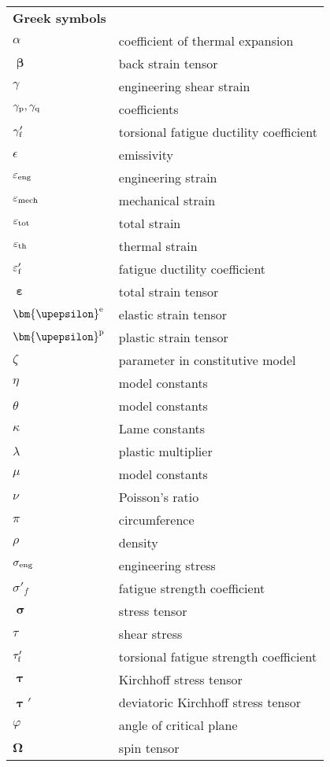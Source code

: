 \renewcommand\arraystretch{1.0}

\begin{table}[htb]
  \centering
    \begin{tabular}{p{3cm}p{10.5cm}}
    \textbf{Greek symbols} & \\
    $\alpha$ & coefficient of thermal expansion \\
    $\bm{\upbeta}$ & back strain tensor \\
    $\gamma$ & engineering shear strain \\
    $\gamma_{\rm{p}}, \gamma_{\rm{q}}$ & coefficients \\
    $\gamma'_{\rm{f}}$ & torsional fatigue ductility coefficient \\
    $\epsilon$ & emissivity \\
    $\varepsilon_{\rm{eng}}$  & engineering strain \\
    $\varepsilon_{\rm{mech}}$ & mechanical strain \\
    $\varepsilon_{\rm{tot}}$ & total strain \\
    $\varepsilon_{\rm{th}}$ & thermal strain \\
    $\varepsilon'_{\rm{f}}$ & fatigue ductility coefficient \\
    $\bm{\upepsilon}$ & total strain tensor \\
    $\bm{\upepsilon}^{\rm{e}}$ & elastic strain tensor \\
    $\bm{\upepsilon}^{\rm{p}}$ & plastic strain tensor \\
    $\zeta$ & parameter in constitutive model \\
    $\eta$ & model constants \\
    $\theta$ & model constants \\
    $\kappa$ & Lame constants \\
    $\lambda$ & plastic multiplier \\
    $\mu$ & model constants \\
    $\nu$ & Poisson's ratio \\
    $\pi$ & circumference \\
    $\rho$ & density \\
    $\sigma_{\rm{eng}}$  & engineering stress \\
    $\sigma'_f$ & fatigue strength coefficient \\
    $\bm{\upsigma}$ & stress tensor \\
    $\tau$  & shear stress \\
    $\tau'_{\rm{f}}$ & torsional fatigue strength coefficient \\
    $\bm{\uptau}$ & Kirchhoff stress tensor \\
    $\bm{\uptau}'$ & deviatoric Kirchhoff stress tensor \\
    $\varphi$ & angle of critical plane \\
    $\bm{\Omega}$ & spin tensor \\
    \end{tabular}%
  \label{Tab:greek_1}%
\end{table}%

